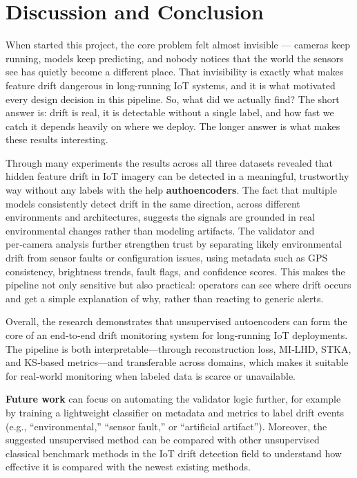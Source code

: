 \documentclass[journal]{IEEEtran} %
\begin{document}
\section{Discussion and Conclusion}

When started this project, the core problem felt almost invisible --- cameras keep running, models keep predicting, and nobody notices that the world the sensors see has quietly become a different place. That invisibility is exactly what makes feature drift dangerous in long-running IoT systems, and it is what motivated every design decision in this pipeline. So, what did we actually find?
 The short answer is: drift is real, it is detectable without a single label, and how fast we catch it depends heavily on where we deploy. The longer answer is what makes these results interesting.

Through many experiments the results across all three datasets revealed that hidden feature drift in IoT imagery can be detected in a meaningful, trustworthy way without any labels with the help \textbf{authoencoders}. The fact that multiple models consistently detect drift in the same direction, across different environments and architectures, suggests the signals are grounded in real environmental changes rather than modeling artifacts. The validator and per‑camera analysis further strengthen trust by separating likely environmental drift from sensor faults or configuration issues, using metadata such as GPS consistency, brightness trends, fault flags, and confidence scores. This makes the pipeline not only sensitive but also practical: operators can see where drift occurs and get a simple explanation of why, rather than reacting to generic alerts.

Overall, the research demonstrates that unsupervised autoencoders can form the core of an end‑to‑end drift monitoring system for long‑running IoT deployments. The pipeline is both interpretable—through reconstruction loss, MI‑LHD, STKA, and KS‑based metrics—and transferable across domains, which makes it suitable for real‑world monitoring when labeled data is scarce or unavailable.

\textbf{Future work} can focus on automating the validator logic further, for example by training a lightweight classifier on metadata and metrics to label drift events (e.g., “environmental,” “sensor fault,” or “artificial artifact”). Moreover, the suggested unsupervised method can be compared with other unsupervised classical benchmark methods in the IoT drift detection field to understand how effective it is compared with the newest existing methods\cite{nine}. 
\end{document}

